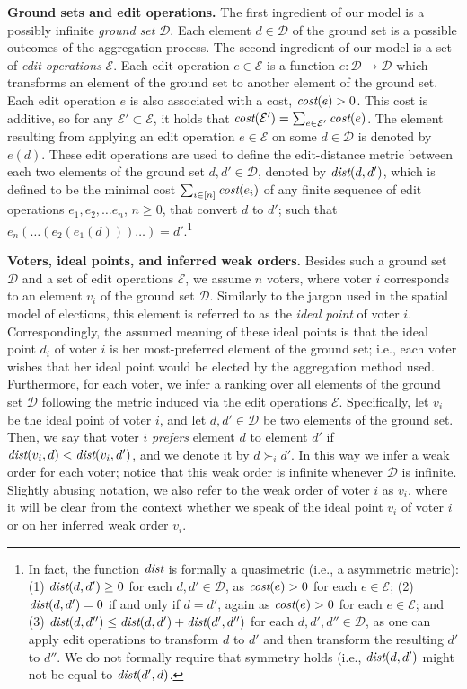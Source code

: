 \documentclass[sigconf]{aamas}  %
\newcommand{\mypara}[1]{\smallskip\noindent\textbf{#1.}}
\newcommand{\calD}{\mathcal{D}}
\newcommand{\calE}{\mathcal{E}}
\newcommand{\prefers}[1]{\succ_{#1}}
\newcommand{\dist}{\emph{dist}}
\newcommand{\cost}{\emph{cost}}
\begin{document}
\mypara{Ground sets and edit operations}
%
The first ingredient of our model is a possibly infinite \emph{ground set} $\calD$.
Each element $d \in \calD$ of the ground set is a possible outcomes of the aggregation process.
The second ingredient of our model is a set of \emph{edit operations} $\calE$.
Each edit operation $e \in \calE$ is a function $e : \calD \to \calD$ which transforms an element of the ground set to another element of the ground set.
Each edit operation $e$ is also associated with a cost, $\cost(e) > 0$.
This cost is additive, so for any $\calE' \subset \calE$, it holds that $\cost(\calE') = \sum_{e \in \calE'} \cost(e)$.
The element resulting from applying an edit operation $e \in \calE$ on some $d \in \calD$ is denoted by $e(d)$.
These edit operations are used to define the edit-distance metric between each two elements of the ground set $d, d' \in \calD$,
denoted by $\dist(d, d')$, which is defined to be the minimal cost $\sum_{i \in [n]} \cost(e_i)$ of any finite sequence of edit operations $e_1, e_2, \ldots e_n$, $n \ge 0$, that convert $d$ to $d'$;
such that $e_n(\ldots(e_2(e_1(d)))\ldots) = d'$.\footnote{%
In fact, the function $\dist$ is formally a quasimetric (i.e., a asymmetric metric):
  (1) $\dist(d, d') \geq 0$ for each $d, d' \in \calD$, as $\cost(e) > 0$ for each $e \in \calE$;
  (2) $\dist(d, d') = 0$ if and only if $d = d'$, again as $\cost(e) > 0$ for each $e \in \calE$;
  and
  (3) $\dist(d, d'') \leq \dist(d, d') + \dist(d', d'')$ for each $d, d', d'' \in \calD$, as one can apply edit operations to transform $d$ to $d'$ and then transform the resulting $d'$ to $d''$.
We do not formally require that symmetry holds (i.e., $\dist(d, d')$ might not be equal to $\dist(d', d)$.}

\mypara{Voters, ideal points, and inferred weak orders}
%
Besides such a ground set $\calD$ and a set of edit operations $\calE$,
we assume $n$ voters, where voter $i$ corresponds to an element $v_i$ of the ground set $\calD$.
Similarly to the jargon used in the spatial model of elections, this element is referred to as the \emph{ideal point} of voter $i$.
Correspondingly, the assumed meaning of these ideal points is that the ideal point $d_i$ of voter $i$ is her most-preferred element of the ground set;
i.e., each voter wishes that her ideal point would be elected by the aggregation method used.
%
Furthermore, for each voter, we infer a ranking over all elements of the ground set $\calD$ following the metric induced via the edit operations $\calE$.
Specifically, let $v_i$ be the ideal point of voter $i$, and let $d, d' \in \calD$ be two elements of the ground set.
Then, we say that voter $i$ \emph{prefers} element $d$ to element $d'$ if $\dist(v_i, d) < \dist(v_i, d')$,
and we denote it by $d \prefers{i} d'$.
In this way we infer a weak order for each voter; notice that this weak order is infinite whenever $\calD$ is infinite.
Slightly abusing notation, we also refer to the weak order of voter $i$ as $v_i$,
where it will be clear from the context whether we speak of the ideal point $v_i$ of voter $i$ or on her inferred weak order $v_i$.
\end{document}
